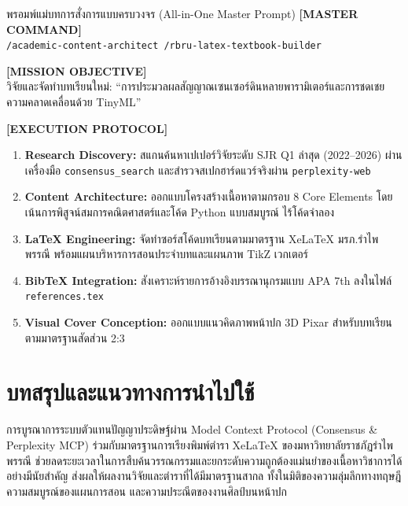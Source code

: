 \begin{promptbox}{พรอมพ์แม่บทการสั่งการแบบครบวงจร (All-in-One Master Prompt)}
\small
\textbf{[MASTER COMMAND]}\\
\texttt{/academic-content-architect /rbru-latex-textbook-builder}

\vspace{4pt}
\textbf{[MISSION OBJECTIVE]}\\
วิจัยและจัดทำบทเรียนใหม่: ``การประมวลผลสัญญาณเซนเซอร์ดินหลายพารามิเตอร์และการชดเชยความคลาดเคลื่อนด้วย TinyML''

\vspace{4pt}
\textbf{[EXECUTION PROTOCOL]}
\begin{enumerate}[leftmargin=15pt, itemsep=2pt]
    \item \textbf{Research Discovery:} สแกนค้นหาเปเปอร์วิจัยระดับ SJR Q1 ล่าสุด (2022--2026) ผ่านเครื่องมือ \texttt{consensus\_search} และสำรวจสเปกฮาร์ดแวร์จริงผ่าน \texttt{perplexity-web}
    \item \textbf{Content Architecture:} ออกแบบโครงสร้างเนื้อหาตามกรอบ 8 Core Elements โดยเน้นการพิสูจน์สมการคณิตศาสตร์และโค้ด Python แบบสมบูรณ์ ไร้โค้ดจำลอง
    \item \textbf{LaTeX Engineering:} จัดทำซอร์สโค้ดบทเรียนตามมาตรฐาน XeLaTeX มรภ.รำไพพรรณี พร้อมแผนบริหารการสอนประจำบทและแผนภาพ TikZ เวกเตอร์
    \item \textbf{BibTeX Integration:} สังเคราะห์รายการอ้างอิงบรรณานุกรมแบบ APA 7th ลงในไฟล์ \texttt{references.tex}
    \item \textbf{Visual Cover Conception:} ออกแบบแนวคิดภาพหน้าปก 3D Pixar สำหรับบทเรียนตามมาตรฐานสัดส่วน 2:3
\end{enumerate}
\end{promptbox}
\label{box:prompt_all_in_one}

\section{บทสรุปและแนวทางการนำไปใช้}

การบูรณาการระบบตัวแทนปัญญาประดิษฐ์ผ่าน Model Context Protocol (Consensus \& Perplexity MCP) ร่วมกับมาตรฐานการเรียงพิมพ์ตำรา XeLaTeX ของมหาวิทยาลัยราชภัฏรำไพพรรณี ช่วยลดระยะเวลาในการสืบค้นวรรณกรรมและยกระดับความถูกต้องแม่นยำของเนื้อหาวิชาการได้อย่างมีนัยสำคัญ ส่งผลให้ผลงานวิจัยและตำราที่ได้มีมาตรฐานสากล ทั้งในมิติของความลุ่มลึกทางทฤษฎี ความสมบูรณ์ของแผนการสอน และความประณีตของงานศิลป์บนหน้าปก
